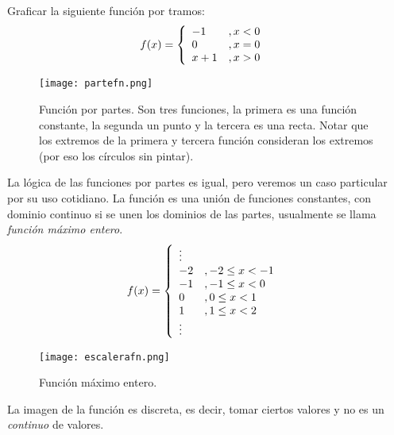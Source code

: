 \begin{myexample}
Graficar la siguiente función por tramos:
\begin{eqnarray*}
 f(x)= \left\{\begin{array}{ll}
-1&, x< 0\\
0 &, x=0\\ 
x+1 &, x>0 \\
\end{array} \hspace{6px} \right.
\end{eqnarray*}

\begin{center}
\begin{figure}[h!]
\centering
\texttt{[image: partefn.png]}
\caption[Función por partes.]{Función por partes. Son tres funciones, la primera es una función constante, la segunda un punto y la tercera es una recta. Notar que los extremos de la primera y tercera función consideran los extremos (por eso los círculos sin pintar). } \label{partefn}
\end{figure}
\end{center}
\end{myexample}
La lógica de las funciones por partes es igual, pero veremos un caso particular por su uso cotidiano. La función es una unión de funciones constantes, con dominio continuo si se unen los dominios de las partes, usualmente se llama \textit{función máximo entero}.
\begin{eqnarray*}
 f(x)= \left\{\begin{array}{ll}
 \vdots \\
-2&, -2\leq x< -1\\
-1&, -1\leq x<0\\ 
0 &, 0\leq x < 1\\
1&, 1\leq x <2\\
\vdots
\end{array} \hspace{6px} \right.
\end{eqnarray*}

\begin{center}
\begin{figure}[h!]
\centering
\texttt{[image: escalerafn.png]}
\caption[Función máximo entero.]{Función máximo entero.  } \label{escalerafn}
\end{figure}
\end{center}

La imagen de la función es discreta, es decir, tomar ciertos valores y no es un \textit{continuo} de valores. 
\newpage

